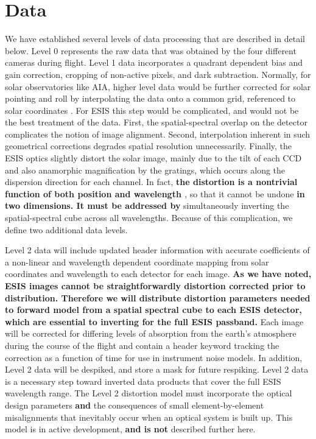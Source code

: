 \documentclass[linenumbers,trackchanges]{aastex63}
\begin{document}
		



	
\section{Data} 

We have established several levels of data processing that are described in detail below.
Level 0 represents the raw data that was obtained by the four different cameras during flight.
Level 1 data incorporates a quadrant dependent bias and gain correction, cropping of non-active pixels, and dark subtraction.
Normally, for solar observatories like AIA, higher level data would be further corrected for solar pointing and roll by interpolating the data onto a common grid, referenced to solar coordinates \citep{Lemen2012}.
For ESIS this step would be complicated, and would not be the best treatment of the data.  
First, the spatial-spectral overlap on the detector complicates the notion of image alignment. Second, interpolation inherent in such geometrical corrections degrades spatial resolution unnecessarily.  
Finally, the ESIS optics slightly distort the solar image, mainly due to the tilt of each CCD and also anamorphic magnification by the gratings, which occurs along the dispersion direction for each channel. 
In fact, \textbf{the distortion is a nontrivial function of both position and wavelength \citep{ESIS}}, so that it cannot be undone \textbf{in two dimensions. It must be addressed by} simultaneously inverting the spatial-spectral cube across all wavelengths.
Because of this complication, we define two additional data levels.  

Level 2 data will include updated header information with accurate coefficients of a non-linear and wavelength dependent coordinate mapping from solar coordinates and wavelength to each detector for each image.
\textbf{As we have noted, ESIS images cannot be straightforwardly distortion corrected prior to distribution.
Therefore we will distribute distortion parameters needed to forward model from a spatial spectral cube to each ESIS detector, which are essential to inverting for the full ESIS passband. }
Each image will be corrected for differing levels of absorption from the earth's atmosphere during the course of the flight and contain a header keyword tracking the correction as a function of time for use in instrument noise models.
In addition, Level 2 data will be despiked, and store a mask for future respiking.
Level 2 data is a necessary step toward inverted data products that cover the full ESIS wavelength range. 
The Level 2 distortion model must incorporate the optical design parameters \textbf{and} the consequences of small element-by-element misalignments that inevitably occur when an optical system is built up.  
This model is in active development, \textbf{and is not} described further here.
\end{document}
